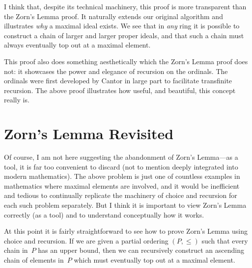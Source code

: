 \documentclass[letterpaper]{article}
\begin{document}
I think that, despite its technical machinery, this proof is more transparent than the Zorn's Lemma proof. It naturally extends our original algorithm and illustrates \emph{why} a maximal ideal exists. We see that in \emph{any} ring it is possible to construct a chain of larger and larger proper ideals, and that such a chain must always eventually top out at a maximal element.

This proof also does something aesthetically which the Zorn's Lemma proof does not: it showcases the power and elegance of recursion on the ordinals. The ordinals were first developed by Cantor in large part to facilitate transfinite recursion. The above proof illustrates how useful, and beautiful, this concept really is.

\section*{Zorn's Lemma Revisited}
Of course, I am not here suggesting the abandonment of Zorn's Lemma---as a tool, it is far too convenient to discard (not to mention deeply integrated into modern mathematics). The above problem is just one of countless examples in mathematics where maximal elements are involved, and it would be inefficient and tedious to continually replicate the machinery of choice and recursion for each such problem separately. But I think it is important to view Zorn's Lemma correctly (as a tool) and to understand conceptually how it works.

At this point it is fairly straightforward to see how to prove Zorn's Lemma using choice and recursion. If we are given a partial ordering $(P,\le)$ such that every chain in~$P$ has an upper bound, then we can recursively construct an ascending chain of elements in~$P$ which must eventually top out at a maximal element.
\end{document}
